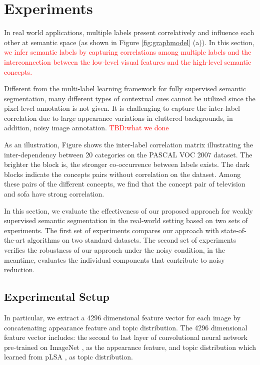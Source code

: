 \section{Experiments}

In real world applications, multiple labels present correlatively and influence each other at semantic space (as shown in Figure \ref{fig:graphmodel} (a)). In this section, {\textcolor{red}{we infer semantic labels by capturing correlations among multiple labels and the interconnection between the low-level visual features and the high-level semantic concepts.}}

Different from the multi-label learning framework for fully supervised semantic segmentation, many different types of contextual cues cannot be utilized since the pixel-level annotation is not given. It is challenging to capture the inter-label correlation due to large appearance variations in cluttered backgrounds, in addition, noisy image annotation. {\textcolor{red}{TBD:what we done}}

As an illustration, Figure shows the inter-label correlation matrix illustrating the inter-dependency between 20 categories on the PASCAL VOC 2007 dataset. The brighter the block is, the stronger co-occurrence between labels exists. The dark blocks indicate the concepts pairs without correlation on the dataset.
Among these pairs of the different concepts, we find that the concept pair of television and sofa have strong correlation.

In this section, we evaluate the effectiveness of our proposed approach for weakly supervised semantic segmentation in the real-world setting based on two sets of experiments. The first set of experiments compares our approach with state-of-the-art algorithms on two standard datasets. The second set of experiments verifies the robustness of our approach under the noisy condition, in the meantime, evaluates the individual components that contribute to noisy reduction.

\subsection{Experimental Setup}
\if
In particular, we extract a 4296 dimensional feature vector for each image by concatenating appearance feature and topic distribution. The 4296 dimensional feature vector includes: the second to last layer of convolutional neural network \cite{simonyan2014very} pre-trained on ImageNet \cite{russakovsky2014imagenet}, as the appearance feature, and topic distribution which learned from pLSA \cite{hofmann1999probabilistic}, as topic distribution.
\fi

